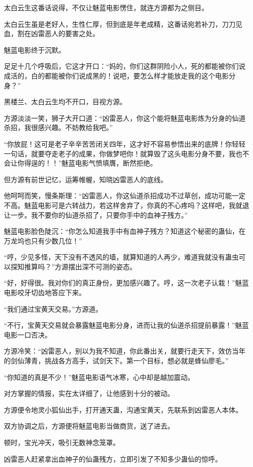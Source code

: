 \begin{this_body}
太白云生这番话说得，不仅让魅蓝电影愣住，就连方源都为之侧目。

太白云生虽是老好人，生性仁厚，但到底是年老成精，这番话宛若补刀，刀刀见血，割在凶雷恶人的要害之处。

魅蓝电影终于沉默。

足足十几个呼吸后，它这才开口：“妈的，你们这群阴险小人，死的都能被你们说成活的，白的都能被你们说成黑的！说吧，要怎么样才能放走我的这个电影分身？”

黑楼兰、太白云生均不开口，目视方源。

方源淡淡一笑，狮子大开口道：“凶雷恶人，你这个能将魅蓝电影炼为分身的仙道杀招，我很感兴趣。不妨教给我吧。”

“你放屁！这可是老子辛辛苦苦闭关四年，这才好不容易参悟出来的底牌！你轻轻一句话，就要夺走老子的成果，你做梦吧你！就算毁了这头电影分身不要，我也不会让你得逞的！！”魅蓝电影气愤填膺，断然拒绝。

但方源有前世记忆，运筹帷幄，知晓凶雷恶人的底线。

他呵呵而笑，慢条斯理：“凶雷恶人，你这仙道杀招成功不过草创，成功可能一定不高。魅蓝电影可是六转战力，若这样舍弃了，你真的不心疼吗？这样吧，我就退让一步。我不要你的仙道杀招了，只要你手中的血神子残方。”

魅蓝电影脸色陡沉：“你怎么知道我手中有血神子残方？知道这个秘密的蛊仙，在万龙坞也只有少数几位！”

“哼，少见多怪，天下没有不透风的墙，就算知道的人再少，难道我就没有蛊虫可以探知推算吗？”方源摆出深不可测的姿态。

“好，好得很。我对你们的真正身份，更加感兴趣了。哼，这一次老子认栽！”魅蓝电影咬牙切齿地答应下来。

“我们通过宝黄天交易。”方源道。

“不行，宝黄天交易就会暴露魅蓝电影分身，进而让我的仙道杀招提前暴露！”魅蓝电影一口否决。

方源冷笑：“凶雷恶人，别以为我不知道，你此番出关，就要行走天下，效仿当年的剑仙薄青，挑战各方高手，试剑天下。第一个目标，想必就是蜂仙廖毛。”

“你知道的真是不少！”魅蓝电影语气冰寒，心中却是越加震动。

对方掌握的情报，实在太详细了，让他感到十分的被动。

方源便令地灵小狐仙出手，打开通天蛊，沟通宝黄天，先联系到凶雷恶人本体。

双方协调之后，方源便将魅蓝电影当做商货，送了进去。

顿时，宝光冲天，吸引无数神念笼罩。

凶雷恶人赶紧拿出血神子的仙蛊残方，立即引发了不知多少蛊仙的惊呼。


\end{this_body}
